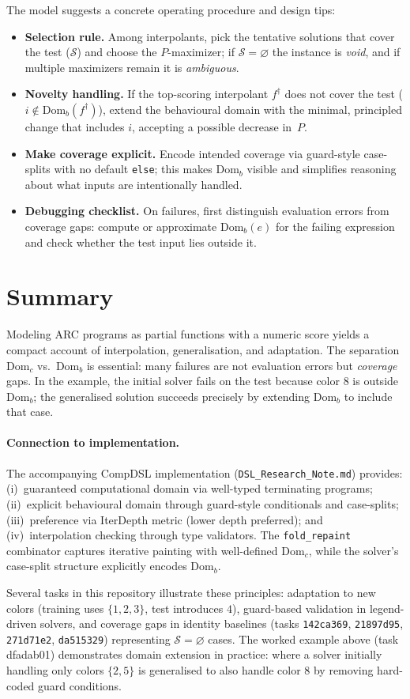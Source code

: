 \documentclass[11pt]{article}
\newcommand{\Domc}{\mathrm{Dom}_c}
\newcommand{\Domb}{\mathrm{Dom}_b}
\begin{document}
The model suggests a concrete operating procedure and design tips:
\begin{itemize}[leftmargin=1.5em]
\item \textbf{Selection rule.} Among interpolants, pick the tentative solutions that cover the test ($\mathcal{S}$) and choose the $P$-maximizer; if $\mathcal{S}=\varnothing$ the instance is \emph{void}, and if multiple maximizers remain it is \emph{ambiguous}.
\item \textbf{Novelty handling.} If the top-scoring interpolant $f^\dagger$ does not cover the test ($i\notin \Domb(f^\dagger)$), extend the behavioural domain with the minimal, principled change that includes $i$, accepting a possible decrease in~$P$.
\item \textbf{Make coverage explicit.} Encode intended coverage via guard-style case-splits with no default \texttt{else}; this makes $\Domb$ visible and simplifies reasoning about what inputs are intentionally handled.
\item \textbf{Debugging checklist.} On failures, first distinguish evaluation errors from coverage gaps: compute or approximate $\Domb(e)$ for the failing expression and check whether the test input lies outside it.
\end{itemize}

\section{Summary}

Modeling ARC programs as partial functions with a numeric score yields a compact account of interpolation, generalisation, and adaptation. The separation $\Domc$ vs.\ $\Domb$ is essential: many failures are not evaluation errors but \emph{coverage} gaps. In the example, the initial solver fails on the test because color $8$ is outside $\Domb$; the generalised solution succeeds precisely by extending $\Domb$ to include that case.

\paragraph{Connection to implementation.} The accompanying CompDSL implementation (\texttt{DSL\_Research\_Note.md}) provides: (i)~guaranteed computational domain via well-typed terminating programs; (ii)~explicit behavioural domain through guard-style conditionals and case-splits; (iii)~preference via IterDepth metric (lower depth preferred); and (iv)~interpolation checking through type validators. The \texttt{fold\_repaint} combinator captures iterative painting with well-defined $\Domc$, while the solver's case-split structure explicitly encodes $\Domb$.

Several tasks in this repository illustrate these principles: adaptation to new colors (training uses $\{1,2,3\}$, test introduces $4$), guard-based validation in legend-driven solvers, and coverage gaps in identity baselines (tasks \texttt{142ca369}, \texttt{21897d95}, \texttt{271d71e2}, \texttt{da515329}) representing $\mathcal{S}=\varnothing$ cases. The worked example above (task dfadab01) demonstrates domain extension in practice: where a solver initially handling only colors $\{2,5\}$ is generalised to also handle color $8$ by removing hard-coded guard conditions.
\end{document}
